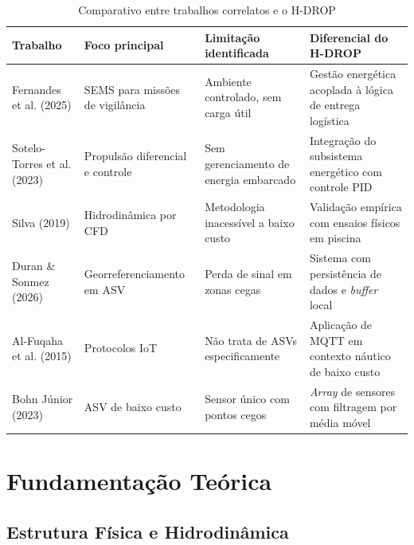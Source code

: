 \documentclass[12pt,a4paper]{article}
\begin{document}
\begin{table}[H]
\centering
\caption{Comparativo entre trabalhos correlatos e o H-DROP}
\label{tab:correlatos}
\renewcommand{\arraystretch}{1.3}
\small
\begin{tabularx}{\textwidth}{|p{2.2cm}|X|X|X|}
\hline
\rowcolor{gray!20}
\textbf{Trabalho} & \textbf{Foco principal} & \textbf{Limitação identificada} & \textbf{Diferencial do H-DROP} \\ \hline
Fernandes et al. (2025) & SEMS para missões de vigilância & Ambiente controlado, sem carga útil & Gestão energética acoplada à lógica de entrega logística \\ \hline
Sotelo-Torres et al. (2023) & Propulsão diferencial e controle & Sem gerenciamento de energia embarcado & Integração do subsistema energético com controle PID \\ \hline
Silva (2019) & Hidrodinâmica por CFD & Metodologia inacessível a baixo custo & Validação empírica com ensaios físicos em piscina \\ \hline
Duran \& Sonmez (2026) & Georreferenciamento em ASV & Perda de sinal em zonas cegas & Sistema com persistência de dados e \textit{buffer} local \\ \hline
Al-Fuqaha et al. (2015) & Protocolos IoT & Não trata de ASVs especificamente & Aplicação de MQTT em contexto náutico de baixo custo \\ \hline
Bohn Júnior (2023) & ASV de baixo custo & Sensor único com pontos cegos & \textit{Array} de sensores com filtragem por média móvel \\ \hline
\end{tabularx}
\end{table}

\section{Fundamentação Teórica}

\subsection{Estrutura Física e Hidrodinâmica}
\end{document}
